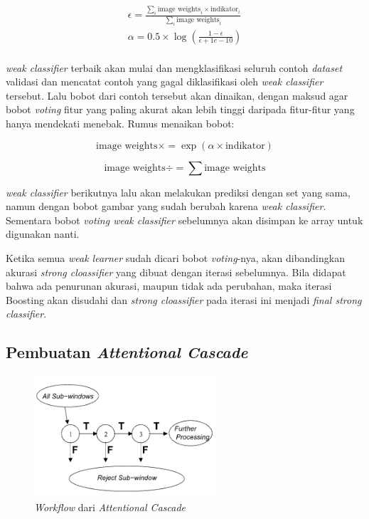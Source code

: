 \begin{equation}
  \begin{split}
    \epsilon = \frac{\sum_{i} \text{{image weights}}_i \times \text{{indikator}}_i}{\sum_{i} \text{{image weights}}_i} \\
   \alpha = 0.5 \times \log\left(\frac{1 - \epsilon}{\epsilon + 1e-10}\right) \\
  \end{split}
\end{equation}

\emph{weak classifier} terbaik akan mulai dan 
mengklasifikasi seluruh contoh \emph{dataset} validasi dan mencatat contoh yang 
gagal diklasifikasi oleh \emph{weak classifier} tersebut. Lalu bobot dari contoh tersebut akan 
dinaikan, dengan maksud agar bobot \textit{voting} fitur yang paling akurat akan lebih tinggi daripada 
fitur-fitur yang hanya mendekati menebak. Rumus menaikan bobot:

\begin{equation}
  \text{{image weights}} \times= \exp(\alpha \times \text{{indikator}})
\end{equation}
  
\begin{equation}
  \text{{image weights}} \div= \sum \text{{image weights}}
\end{equation}

\textit{weak classifier} berikutnya lalu akan melakukan prediksi dengan set yang sama, 
namun dengan bobot gambar yang sudah berubah karena \textit{weak classifier}. Sementara 
bobot \textit{voting weak classifier} sebelumnya akan disimpan ke array untuk digunakan nanti. 

Ketika semua \textit{weak learner} sudah dicari bobot \textit{voting}-nya, akan dibandingkan 
akurasi \textit{strong cloassifier} yang dibuat dengan iterasi sebelumnya. Bila didapat bahwa 
ada penurunan akurasi, maupun tidak ada perubahan, maka iterasi Boosting akan disudahi dan 
\textit{strong cloassifier} pada iterasi ini menjadi \textit{final strong classifier}.

\subsection{Pembuatan \emph{Attentional Cascade}}

\begin{figure}[H]
  \centering{}
	\includegraphics[width=0.6\textwidth]{gambar/cascade}
  \caption{\textit{Workflow} dari \emph{Attentional Cascade}}
\end{figure}


